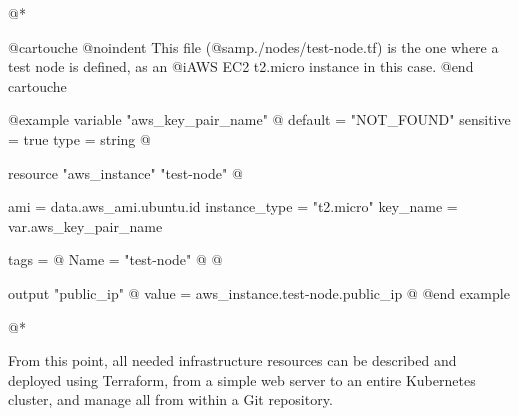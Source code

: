 @*

@cartouche
@noindent This file (@samp{./nodes/test-node.tf}) is the one where a test node is defined, as an @i{AWS EC2 t2.micro}  instance in this case.
@end cartouche

@example
variable "aws_key_pair_name" @{
  default = "NOT_FOUND"
  sensitive = true
  type = string
@}

resource "aws_instance" "test-node" @{
  ami = data.aws_ami.ubuntu.id
  instance_type = "t2.micro"
  key_name = var.aws_key_pair_name

  tags = @{
    Name = "test-node"
  @}
@}

output "public_ip" @{
  value = aws_instance.test-node.public_ip
@}
@end example

@*

From this point, all needed infrastructure resources can be described and deployed using Terraform, from a simple web server to an entire Kubernetes cluster, and manage all from within a Git repository.
